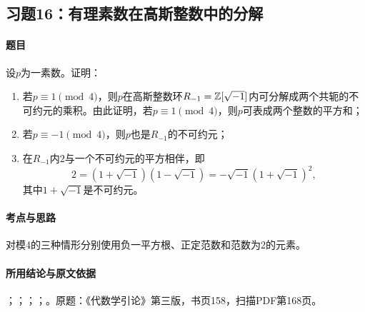 \subsection{习题16：有理素数在高斯整数中的分解}

\label{ex:4:16}

\paragraph{题目}

设$p$为一素数。证明：
\begin{enumerate}[label=(\roman*)]
\item 若$p\equiv1\pmod4$，则$p$在高斯整数环$R_{-1}=\mathbb Z[\sqrt{-1}]$内可分解成两个共轭的不可约元的乘积。由此证明，若$p\equiv1\pmod4$，则$p$可表成两个整数的平方和；
\item 若$p\equiv-1\pmod4$，则$p$也是$R_{-1}$的不可约元；
\item 在$R_{-1}$内$2$与一个不可约元的平方相伴，即
\[
2=(1+\sqrt{-1})(1-\sqrt{-1})=-\sqrt{-1}(1+\sqrt{-1})^2,
\]
其中$1+\sqrt{-1}$是不可约元。
\end{enumerate}

\paragraph{考点与思路}

对模4的三种情形分别使用负一平方根、正定范数和范数为2的元素。

\paragraph{所用结论与原文依据}

；；；；。原题：《代数学引论》第三版，书页158，扫描PDF第168页。


